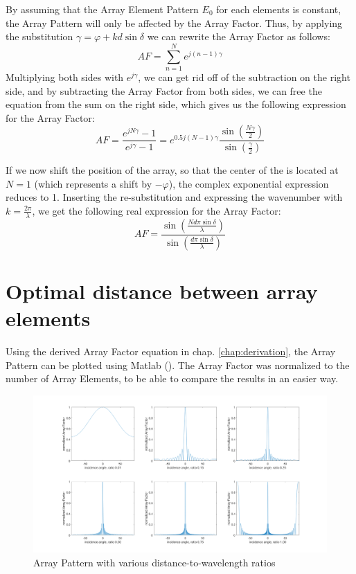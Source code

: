 By assuming that the Array Element Pattern $E_0$ for each elements is constant, the Array Pattern will only be affected by the Array Factor. Thus, by applying the substitution $\gamma = \varphi + kd\sin\delta$ we can rewrite the Array Factor as follows:
\begin{equation}
	AF = \sum_{n=1}^N e^{j(n-1)\gamma}
\end{equation}
Multiplying both sides with $e^{j\gamma}$, we can get rid off of the subtraction on the right side, and by subtracting the Array Factor from both sides, we can free the equation from the sum on the right side, which gives us the following expression for the Array Factor:
\begin{equation}
	AF = \frac{e^{jN\gamma} - 1}{e^{j\gamma} - 1} = e^{0.5j(N-1)\gamma} \frac{\sin(\frac{N\gamma}{2} )}{\sin(\frac{\gamma}{2} )}
\end{equation}

If we now shift the position of the array, so that the center of the is located at $N = 1$ (which represents a shift by $-\varphi$), the complex exponential expression reduces to 1. Inserting the re-substitution and expressing the wavenumber with $k = \frac{2\pi}{\lambda}$, we get the following real expression for the Array Factor:
\begin{equation}
	AF = \frac{\sin(\frac{Nd\pi\sin\delta}{\lambda})}{\sin(\frac{d\pi\sin\delta}{\lambda})}
	\label{eq:AF}
\end{equation}

\section{Optimal distance between array elements}
Using the derived Array Factor equation in chap. \ref{chap:derivation}, the Array Pattern can be plotted using Matlab (). The Array Factor was normalized to the number of Array Elements, to be able to compare the results in an easier way.

\begin{figure}[h!]
	\centering
	\includegraphics[width=\textwidth]{images/distanceVariation}
	\caption{Array Pattern with various distance-to-wavelength ratios}
	\label{fig:distance}
\end{figure} 

